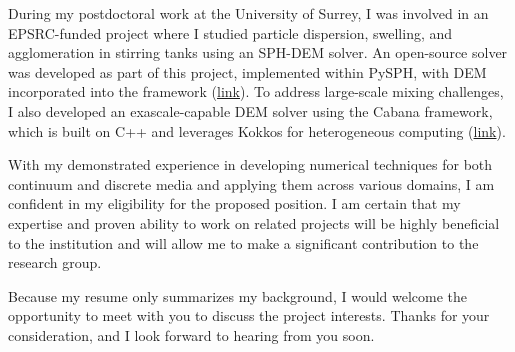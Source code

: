 \documentclass[11pt,a4paper,roman]{moderncv}
\begin{document}
\vspace{0.5cm}
During my postdoctoral work at the University of Surrey, I was
involved in an EPSRC-funded project where I studied particle dispersion,
swelling, and agglomeration in stirring tanks using an SPH-DEM solver. An
open-source solver was developed as part of this project, implemented within
PySPH, with DEM incorporated into the framework
(\href{https://github.com/dineshadepu/sph\_dem}{link}). To address large-scale
mixing challenges, I also developed an exascale-capable DEM solver using the
Cabana framework, which is built on C++ and leverages Kokkos for heterogeneous
computing (\href{https://github.com/ExaPhysics/CabanaDEM}{link}).


\vspace{0.5cm}
With my demonstrated experience in developing numerical techniques for both
continuum and discrete media and applying them across various domains, I am
confident in my eligibility for the proposed position. I am certain that my
expertise and proven ability to work on related projects will be highly
beneficial to the institution and will allow me to make a significant
contribution to the research group.


\vspace{0.5cm}
Because my resume only summarizes my background, I would welcome the opportunity
to meet with you to discuss the project interests. Thanks for your
consideration, and I look forward to hearing from you soon.



\makeletterclosing
\end{document}
